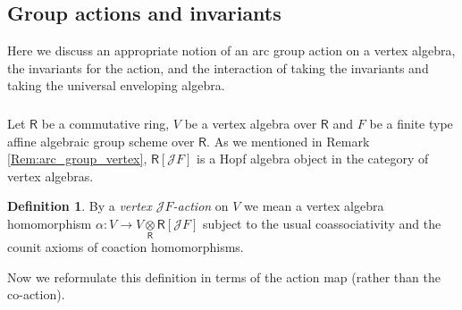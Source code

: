 \documentclass{amsart}
\theoremstyle{definition}
\newtheorem{defi}[Thm]{Definition}
\newcommand{\sss}{\subsubsection{}}
\newcommand{\Ring}{\mathsf{R}}
\newcommand{\g}{\mathfrak{g}}
\newcommand{\Jet}{\mathscr{J}}
\numberwithin{equation}{section}
\begin{document}

\subsection{Group actions and invariants}
Here we discuss an appropriate notion of an arc group action on a vertex algebra, the invariants for the action, and the interaction of taking the invariants and taking the universal enveloping algebra. 

\sss
Let $\Ring$ be a commutative ring, $V$ be a vertex algebra over $\Ring$ and $F$ be a finite type affine algebraic group scheme over $\Ring$. 
As we mentioned in Remark \ref{Rem:arc_group_vertex},
$\Ring[\Jet F]$ is a Hopf algebra object in the category of vertex algebras.

\begin{defi}\label{defi:vertex_action}
By a {\it vertex  $\Jet F$-action} on $V$ we mean a vertex algebra homomorphism $\alpha:V\rightarrow V\underset{\Ring}\otimes \Ring[\Jet F]$ subject to the usual coassociativity and the counit axioms of coaction homomorphisms. 
\end{defi}

Now we reformulate this definition in terms of the action map (rather than the co-action). 
\end{document}
